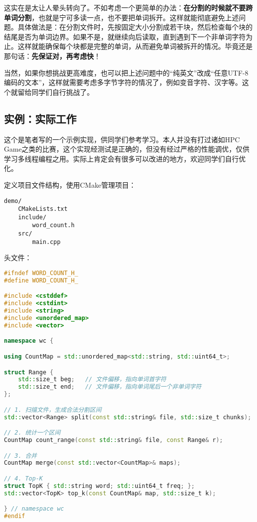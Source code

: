 这实在是太让人晕头转向了。不如考虑一个更简单的办法：\textbf{在分割的时候就不要跨单词分割}，也就是宁可多读一点，也不要把单词拆开。这样就能彻底避免上述问题。具体做法是：在分割文件时，先按固定大小分割成若干块，然后检查每个块的结尾是否为单词边界。如果不是，就继续向后读取，直到遇到下一个非单词字符为止。这样就能确保每个块都是完整的单词，从而避免单词被拆开的情况。毕竟还是那句话：\textbf{先保证对，再考虑快}！

当然，如果你想挑战更高难度，也可以把上述问题中的“纯英文”改成“任意UTF-8编码的文本”，这样就需要考虑多字节字符的情况了，例如变音字符、汉字等。这个就留给同学们自行挑战了。

\subsection{实例：实际工作}

\begin{note}
    这个是笔者写的一个示例实现，供同学们参考学习。本人并没有打过诸如HPC Game之类的比赛，这个实现经测试是正确的，但没有经过严格的性能调优，仅供学习多线程编程之用。实际上肯定会有很多可以改进的地方，欢迎同学们自行优化。
\end{note}

定义项目文件结构，使用CMake管理项目：
\begin{lstlisting}
demo/
    CMakeLists.txt
    include/
        word_count.h
    src/
        main.cpp
\end{lstlisting}

头文件：
\begin{lstlisting}[language=C++]
#ifndef WORD_COUNT_H_
#define WORD_COUNT_H_

#include <cstddef>
#include <cstdint>
#include <string>
#include <unordered_map>
#include <vector>

namespace wc {

using CountMap = std::unordered_map<std::string, std::uint64_t>;

struct Range {
    std::size_t beg;   // 文件偏移，指向单词首字符
    std::size_t end;   // 文件偏移，指向单词尾后一个非单词字符
};

// 1. 扫描文件，生成合法分割区间
std::vector<Range> split(const std::string& file, std::size_t chunks);

// 2. 统计一个区间
CountMap count_range(const std::string& file, const Range& r);

// 3. 合并
CountMap merge(const std::vector<CountMap>& maps);

// 4. Top-K
struct TopK { std::string word; std::uint64_t freq; };
std::vector<TopK> top_k(const CountMap& map, std::size_t k);

} // namespace wc
#endif
\end{lstlisting}


